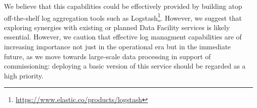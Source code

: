 We believe that this capabilities could be effectively provided by building
atop off-the-shelf log aggregation tools such as
Logstash\footnote{\url{https://www.elastic.co/products/logstash}}. However, we
suggest that exploring synergies with existing or planned Data Facility
services is likely essential. However, we caution that effective log managment
capabilities are of increasing importance not just in the operational era but
in the immediate future, as we move towards large-scale data processing in
support of commissioning: deploying a basic version of this service should be
regarded as a high priority.
